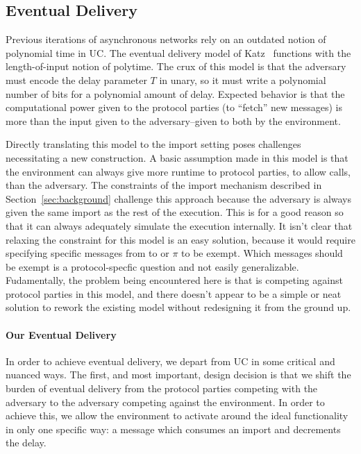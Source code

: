 

\subsection{Eventual Delivery} %
Previous iterations of asynchronous networks rely on an outdated notion of
polynomial time in UC.  The eventual delivery model of
Katz~\cite{katz2013universally} functions with the length-of-input notion of
polytime.  The crux of this model is that the adversary must encode the delay
parameter $T$ in unary, so it must write a polynomial number of bits for a
polynomial amount of delay.  Expected behavior is that the computational power
given to the protocol parties (to ``fetch'' new messages) is more than the
input given to the adversary--given to both by the environment.

Directly translating this model to the import setting poses challenges
necessitating a new construction.  A basic assumption made in this model is
that the environment can always give more runtime to protocol parties, to allow
 calls, than the adversary.  The constraints of the import mechanism
described in Section~\ref{sec:background} challenge this approach because the
adversary is always given the same import as the rest of the execution.  This
is for a good reason so that it can always adequately simulate the execution
internally.  It isn't clear that relaxing the constraint for this model is an
easy solution, because it would require specifying specific messages from \Z to
\A or $\pi$ to be exempt.  Which messages should be exempt is a
protocol-specfic question and not easily generalizable.  Fudamentally, the
problem being encountered here is that \A is competing against protocol parties
in this model, and there doesn't appear to be a simple or neat solution to
rework the existing model without redesigning it from the ground up.

\paragraph{Our Eventual Delivery} %
In order to achieve eventual delivery, we depart from UC in some critical and
nuanced ways.  The first, and most important, design decision is that we shift
the burden of eventual delivery from the protocol parties competing with the
adversary to the adversary competing against the environment.  In order to
achieve this, we allow the environment to activate \fwrapper around the ideal
functionality in only one specific way: a  message which
consumes an import and decrements the delay.

